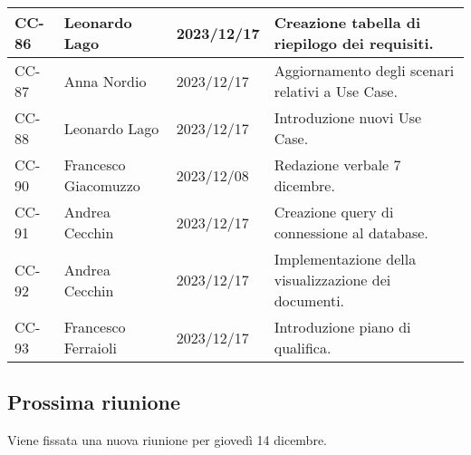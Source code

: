{\begin{xltabular}{\textwidth}{| l | l | l | X |}
        \hline
        CC-86 & Leonardo Lago & 2023/12/17 & Creazione tabella di riepilogo dei requisiti. \\
        \hline
        CC-87 & Anna Nordio & 2023/12/17 & Aggiornamento degli scenari relativi a Use Case. \\
        \hline
        CC-88 & Leonardo Lago & 2023/12/17 & Introduzione nuovi Use Case. \\
        \hline
        CC-90 & Francesco Giacomuzzo & 2023/12/08 & Redazione verbale 7 dicembre. \\
        \hline
        CC-91 & Andrea Cecchin & 2023/12/17 & Creazione query di connessione al database. \\
        \hline
        CC-92 & Andrea Cecchin & 2023/12/17 & Implementazione della visualizzazione dei documenti. \\
        \hline 
        CC-93 & Francesco Ferraioli & 2023/12/17 & Introduzione piano di qualifica. \\
        \hline
    \end{xltabular}
}


\subsection{Prossima riunione} \label{subsec:riunione}
Viene fissata una nuova riunione per giovedì 14 dicembre.
